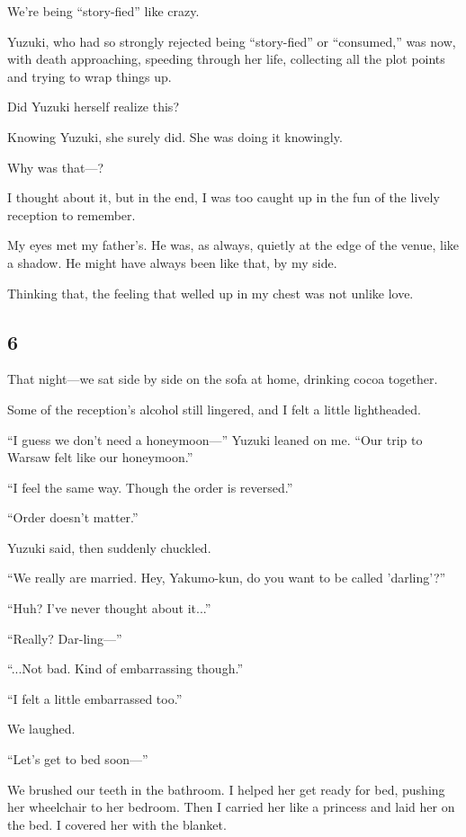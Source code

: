 \documentclass[
    a4paper,
    12pt,
    twoside,
    openany,
    UTF8,
    fontset=windows
]{ctexbook}
\begin{document}
We're being ``story-fied'' like crazy.

Yuzuki, who had so strongly rejected being ``story-fied'' or ``consumed,'' was now, with death approaching, speeding through her life, collecting all the plot points and trying to wrap things up.

Did Yuzuki herself realize this?

Knowing Yuzuki, she surely did. She was doing it knowingly.

Why was that---?

I thought about it, but in the end, I was too caught up in the fun of the lively reception to remember.

My eyes met my father's. He was, as always, quietly at the edge of the venue, like a shadow. He might have always been like that, by my side.

Thinking that, the feeling that welled up in my chest was not unlike love.


\subsection*{6}

That night---we sat side by side on the sofa at home, drinking cocoa together.

Some of the reception's alcohol still lingered, and I felt a little lightheaded.

``I guess we don't need a honeymoon---'' Yuzuki leaned on me. ``Our trip to Warsaw felt like our honeymoon.''

``I feel the same way. Though the order is reversed.''

``Order doesn't matter.''

Yuzuki said, then suddenly chuckled.

``We really are married. Hey, Yakumo-kun, do you want to be called 'darling'?''

``Huh? I've never thought about it...''

``Really? Dar-ling---''

``...Not bad. Kind of embarrassing though.''

``I felt a little embarrassed too.''

We laughed.

``Let's get to bed soon---''

We brushed our teeth in the bathroom. I helped her get ready for bed, pushing her wheelchair to her bedroom. Then I carried her like a princess and laid her on the bed. I covered her with the blanket.
\end{document}
